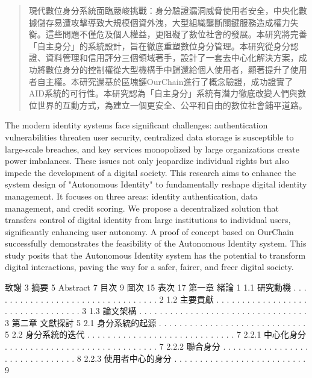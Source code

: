 
\begin{abstract}
  現代數位身分系統面臨嚴峻挑戰：身分驗證漏洞威脅使用者安全，中央化數據儲存易遭攻擊導致大規模個資外洩，大型組織壟斷關鍵服務造成權力失衡。這些問題不僅危及個人權益，更阻礙了數位社會的發展。本研究將完善「自主身分」的系統設計，旨在徹底重塑數位身分管理。本研究從身分認證、資料管理和信用評分三個領域著手，設計了一套去中心化解決方案，成功將數位身分的控制權從大型機構手中歸還給個人使用者，顯著提升了使用者自主權。本研究還基於區塊鏈OurChain進行了概念驗證，成功證實了AID系統的可行性。本研究認為「自主身分」系統有潛力徹底改變人們與數位世界的互動方式，為建立一個更安全、公平和自由的數位社會鋪平道路。
\end{abstract}

\begin{abstract*}
  The modern identity systems face significant challenges: authentication vulnerabilities threaten user security, centralized data storage is susceptible to large-scale breaches, and key services monopolized by large organizations create power imbalances. These issues not only jeopardize individual rights but also impede the development of a digital society. This research aims to enhance the system design of "Autonomous Identity" to fundamentally reshape digital identity management. It focuses on three areas: identity authentication, data management, and credit scoring. We propose a decentralized solution that transfers control of digital identity from large institutions to individual users, significantly enhancing user autonomy. A proof of concept based on OurChain successfully demonstrates the feasibility of the Autonomous Identity system. This study posits that the Autonomous Identity system has the potential to transform digital interactions, paving the way for a safer, fairer, and freer digital society.
\end{abstract*}
致謝 3
摘要 5
Abstract 7
目次 9
圖次 15
表次 17
第一章 緒論 1
1.1 研究動機 . . . . . . . . . . . . . . . . . . . . . . . . . . . . . . . . . 2
1.2 主要貢獻 . . . . . . . . . . . . . . . . . . . . . . . . . . . . . . . . . 3
1.3 論文架構 . . . . . . . . . . . . . . . . . . . . . . . . . . . . . . . . . 3
第二章 文獻探討 5
2.1 身分系統的起源 . . . . . . . . . . . . . . . . . . . . . . . . . . . . . 5
2.2 身分系統的迭代 . . . . . . . . . . . . . . . . . . . . . . . . . . . . . 7
2.2.1 中心化身分 . . . . . . . . . . . . . . . . . . . . . . . . . . . . . . 7
2.2.2 聯合身分 . . . . . . . . . . . . . . . . . . . . . . . . . . . . . . . 8
2.2.3 使用者中心的身分 . . . . . . . . . . . . . . . . . . . . . . . . . . 9
